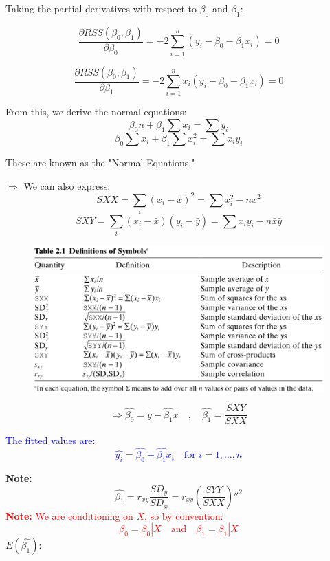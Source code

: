 \documentclass[14pt]{extarticle}
\begin{document}
Taking the partial derivatives with respect to $\beta_0$ and $\beta_1$:

\[
\frac{\partial RSS(\beta_0, \beta_1)}{\partial \beta_0} = -2 \sum_{i=1}^{n} (y_i - \beta_0 - \beta_1 x_i) = 0
\]

\[
\frac{\partial RSS(\beta_0, \beta_1)}{\partial \beta_1} = -2 \sum_{i=1}^{n} x_i (y_i - \beta_0 - \beta_1 x_i) = 0
\]

From this, we derive the normal equations:
\[
\beta_0 n + \beta_1 \sum x_i = \sum y_i
\]
\[
\beta_0 \sum x_i + \beta_1 \sum x_i^2 = \sum x_i y_i
\]

These are known as the "Normal Equations."

$\Rightarrow$ We can also express:
\[
SXX = \sum_{i}(x_i - \bar{x})^2 = \sum x_i^2 - n \bar{x}^2
\]
\[
SXY = \sum_{i}(x_i - \bar{x})(y_i - \bar{y}) = \sum x_i y_i - n \bar{x} \bar{y}
\]

\begin{figure}[H]
    \centering
    \includegraphics[width=1\textwidth]{fig3.png}
\end{figure}
\[
\Rightarrow \hat{\beta_0} = \bar{y} - \hat{\beta_1} \bar{x} \quad , \quad
\hat{\beta_1} = \frac{SXY}{SXX}
\]

\textcolor{blue}{The fitted values are:
\[
\hat{y_i} = \hat{\beta_0} + \hat{\beta_1} x_i \quad \text{for } i = 1, \dots, n
\]}

\textbf{Note:}
\[
\hat{\beta_1} = r_{xy} \frac{SD_y}{SD_x}
= r_{xy} \left( \frac{SYY}{SXX} \right)''^2
\]
\textcolor{red}{
\textbf{Note:} We are conditioning on \( X \), so by convention:
\[
\beta_0 = \beta_0|X \quad \text{and} \quad \beta_1 = \beta_1|X
\]
}
$E(\hat{\beta_1}):$
\end{document}
